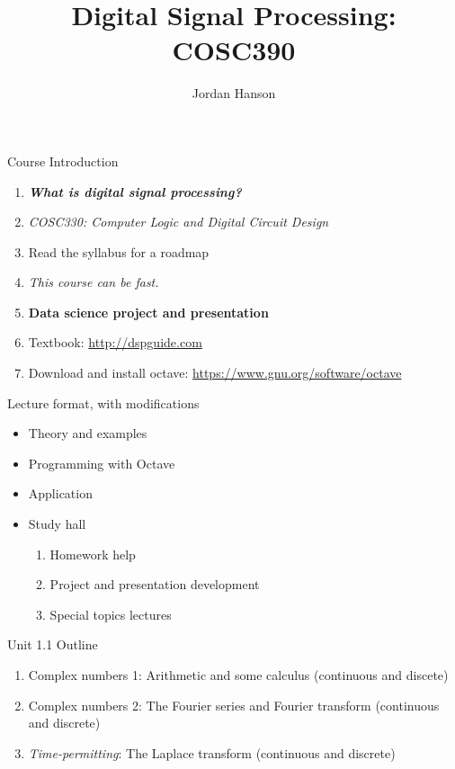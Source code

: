 \documentclass{beamer}
\title{Digital Signal Processing: COSC390}
\author{Jordan Hanson}
\institute{Whittier College Department of Physics and Astronomy}
\begin{document}
\maketitle

\begin{frame}{Course Introduction}
\begin{enumerate}
\item\textit{ \textbf{\alert{What is digital signal processing?}}}
\item \textit{COSC330: Computer Logic and Digital Circuit Design}
\item Read the syllabus for a roadmap
\item \textit{This course can be fast.}
\item \textbf{Data science project and presentation}
\item Textbook: \url{http://dspguide.com}
\item Download and install octave: \url{https://www.gnu.org/software/octave}
\end{enumerate}
\end{frame}

\begin{frame}{Lecture format, with modifications}
\begin{itemize}
\item Theory and examples
\item Programming with Octave
\item Application
\item Study hall
\begin{enumerate}
\item Homework help
\item Project and presentation development
\item Special topics lectures
\end{enumerate}
\end{itemize}
\end{frame}

\begin{frame}{Unit 1.1 Outline}
\begin{enumerate}
\item Complex numbers 1: Arithmetic and some calculus (continuous and discete)
\item Complex numbers 2: The Fourier series and Fourier transform (continuous and discrete)
\item \textit{Time-permitting}: The Laplace transform (continuous and discrete)
\end{enumerate}
\end{frame}
\end{document}
